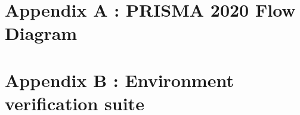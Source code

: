 \documentclass[11pt,a4paper]{article}
\theoremstyle{definition}
\theoremstyle{remark}
\begin{document}
\FloatBarrier



\FloatBarrier





\FloatBarrier


\newpage
\appendix
\section{Appendix A : PRISMA 2020 Flow Diagram}
\label{app:prisma}


\FloatBarrier


\newpage
\appendix
\section{Appendix B : Environment verification suite}
\label{app:env_veri_suit}


\FloatBarrier


% 
\end{document}
